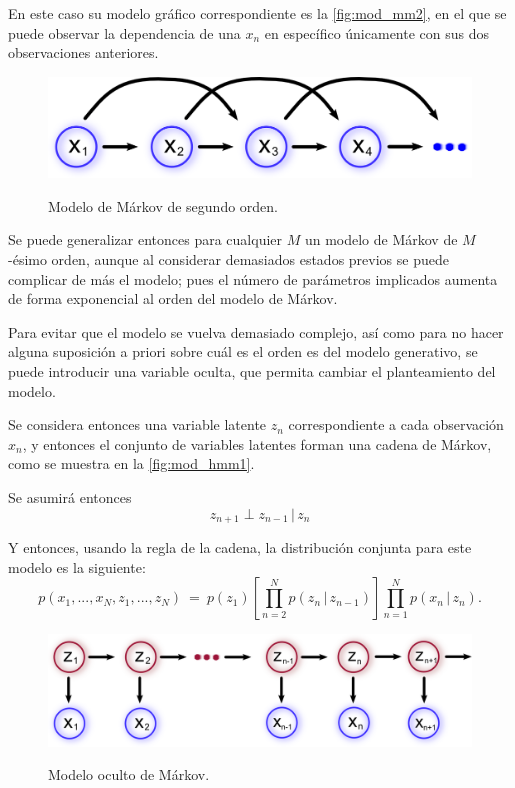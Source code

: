 En este caso su modelo gráfico correspondiente es la \autoref{fig:mod_mm2}, en el que se puede observar la dependencia de una $x_n$ en específico únicamente con sus dos observaciones anteriores.

\begin{figure}[bt]
        \myfloatalign
        {\includegraphics[width=0.6\linewidth]{gfx/chap2/mod-mm2}}
        \caption{Modelo de Márkov de segundo orden.}
        \label{fig:mod_mm2}
\end{figure}

Se puede generalizar entonces para cualquier $M$ un modelo de Márkov de $M$-ésimo orden, aunque al considerar demasiados estados previos se puede complicar de más el modelo; pues el número de parámetros implicados aumenta de forma exponencial al orden del modelo de Márkov.

Para evitar que el modelo se vuelva demasiado complejo, así como para no hacer alguna suposición a priori sobre cuál es el orden es del modelo generativo, se puede introducir una variable oculta, que permita cambiar el planteamiento del modelo. 

Se considera entonces una variable latente $z_n$ correspondiente a cada  observación $x_n$, y entonces el conjunto de variables latentes forman una cadena de Márkov, como se muestra en la \autoref{fig:mod_hmm1}.

Se asumirá entonces 
\begin{equation}
\label{eqn:2-6}
z_{n+1} \perp z_{n-1} \,|\, z_{n}
\end{equation}

Y entonces, usando la regla de la cadena, la distribución conjunta para este modelo es la siguiente: 
\begin{equation}
\label{eqn:2-7}
p(x_1, ..., x_N, z_1, ..., z_N) ~=~ 
        p(z_1) \left [ \prod_{n=2}^N p(z_n \,|\, z_{n-1}) \right ] 
\prod_{n=1}^N p(x_n \,|\, z_{n}).
\end{equation}

\begin{figure}[hbt]
        \myfloatalign
        {\includegraphics[width=0.8\linewidth]{gfx/chap2/mod-hmm1}}
        \caption{Modelo oculto de Márkov.}
        \label{fig:mod_hmm1}
\end{figure}

